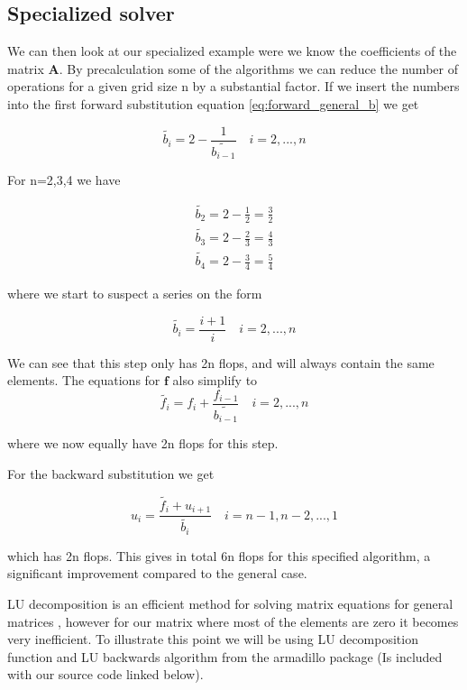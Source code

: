 \documentclass[a4paper,11pt]{article}
\begin{document}
{		\subsection{Specialized solver}
We can then look at our specialized example were we know the coefficients of the matrix $\mathbf{A}$. By precalculation some of the algorithms we can reduce the number of operations for a given grid size n by a substantial factor. If we insert the numbers into the first forward substitution equation \ref{eq:forward_general_b} we get
		
\begin{equation}
\tilde{b_i}=2-\frac{1}{\tilde{b_{i-1}}}\quad i = 2, ..., n
\end{equation}
		
For n=2,3,4 we have 
		
\begin{align}
\tilde{b_2}=2-\frac{1}{2}=\frac{3}{2} \\
\tilde{b_3}=2-\frac{2}{3}=\frac{4}{3} \\
\tilde{b_4}=2-\frac{3}{4}=\frac{5}{4}
\end{align}
	
where we start to suspect a series on the form
		
\begin{equation}
\tilde{b_i}=\frac{i+1}{i}  \quad i = 2, ..., n
\label{eq:forward_specific_b}
\end{equation}
		
We can see that this step only has 2n flops, and will always contain the same elements. The equations for $\mathbf{f}$ also simplify to
\begin{equation}
\tilde{f_i}=f_{i}+\frac{f_{i-1}}{\tilde{b_{i-1}}}\quad i = 2, ..., n
\label{eq:forward_specific_f}
\end{equation}
		
where we now equally have 2n flops for this step. 
		
For the backward substitution we get 
		
\begin{equation}
u_i = \frac{\tilde{f_i} + u_{i+1}}{\tilde{b_i}}\quad i = n-1, n-2, ..., 1
\label{eq:forward_specific_u}
\end{equation}
		
which has 2n flops. 
This gives in total 6n flops for this specified algorithm, a significant improvement compared to the general case. 


LU decomposition is an efficient method for solving matrix equations for general matrices \cite{M.Hjort-Jensen_CompFys}, however for our matrix where most of the elements are zero it becomes very inefficient. To illustrate this point we will be using LU decomposition function and LU backwards algorithm from the armadillo package (Is included with our source code linked below). 

}
\end{document}
